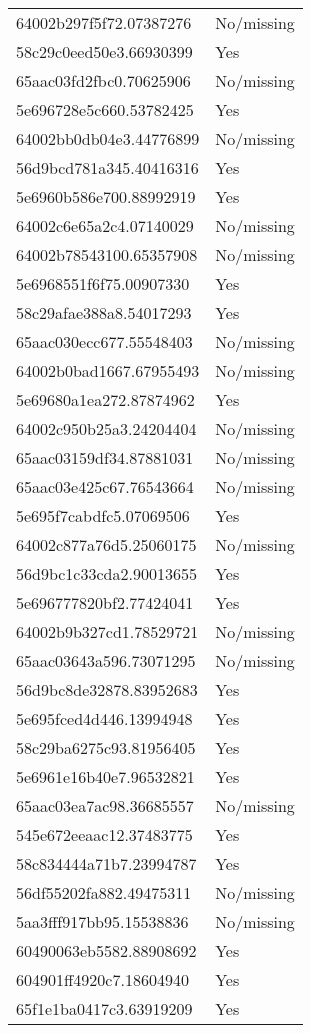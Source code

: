 \begin{tabular}{ll}
64002b297f5f72.07387276 & No/missing \\
58c29c0eed50e3.66930399 & Yes \\
65aac03fd2fbc0.70625906 & No/missing \\
5e696728e5c660.53782425 & Yes \\
64002bb0db04e3.44776899 & No/missing \\
56d9bcd781a345.40416316 & Yes \\
5e6960b586e700.88992919 & Yes \\
64002c6e65a2c4.07140029 & No/missing \\
64002b78543100.65357908 & No/missing \\
5e6968551f6f75.00907330 & Yes \\
58c29afae388a8.54017293 & Yes \\
65aac030ecc677.55548403 & No/missing \\
64002b0bad1667.67955493 & No/missing \\
5e69680a1ea272.87874962 & Yes \\
64002c950b25a3.24204404 & No/missing \\
65aac03159df34.87881031 & No/missing \\
65aac03e425c67.76543664 & No/missing \\
5e695f7cabdfc5.07069506 & Yes \\
64002c877a76d5.25060175 & No/missing \\
56d9bc1c33cda2.90013655 & Yes \\
5e696777820bf2.77424041 & Yes \\
64002b9b327cd1.78529721 & No/missing \\
65aac03643a596.73071295 & No/missing \\
56d9bc8de32878.83952683 & Yes \\
5e695fced4d446.13994948 & Yes \\
58c29ba6275c93.81956405 & Yes \\
5e6961e16b40e7.96532821 & Yes \\
65aac03ea7ac98.36685557 & No/missing \\
545e672eeaac12.37483775 & Yes \\
58c834444a71b7.23994787 & Yes \\
56df55202fa882.49475311 & No/missing \\
5aa3fff917bb95.15538836 & No/missing \\
60490063eb5582.88908692 & Yes \\
604901ff4920c7.18604940 & Yes \\
65f1e1ba0417c3.63919209 & Yes \\

\end{tabular}
